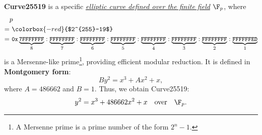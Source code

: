 \colorbox{-red}{\textbf{Curve25519}} is a specific \underline{\textit{elliptic curve defined over the finite field}} $\F_p$, where \begin{align*}
&p\\
=&\ \colorbox{-red}{$2^{255}-19$}\\
=&\ \small\texttt{0x}\underbrace{\texttt{7FFFFFFF}}_8:\underbrace{\texttt{FFFFFFFF}}_7
:\underbrace{\texttt{FFFFFFFF}}_6:\underbrace{\texttt{FFFFFFFF}}_5:\underbrace{\texttt{FFFFFFFF}}_4
:\underbrace{\texttt{FFFFFFFF}}_3:\underbrace{\texttt{FFFFFFFF}}_2:\underbrace{\texttt{FFFFFFED}}_1
\end{align*} is a Mersenne-like prime\footnote{A Mersenne prime is a prime number of the form $2^n-1$.}, providing efficient modular reduction. It is defined in \textbf{Montgomery form}: \[
By^2=x^3+Ax^2+x,
\] where $A=486662$ and $B=1$. Thus, we obtain Curve25519: \[
y^2=x^3+486662x^2+x\quad\text{over}\quad\F_p.
\]